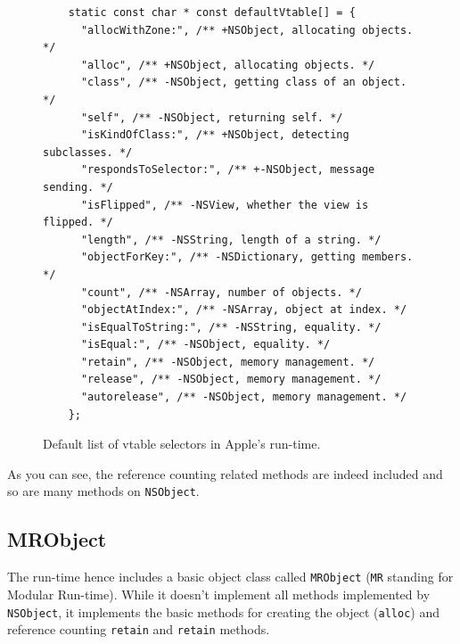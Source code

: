 \begin{figure}
  \begin{verbatim}
    static const char * const defaultVtable[] = {
      "allocWithZone:", /** +NSObject, allocating objects. */
      "alloc", /** +NSObject, allocating objects. */
      "class", /** -NSObject, getting class of an object. */
      "self", /** -NSObject, returning self. */
      "isKindOfClass:", /** +NSObject, detecting subclasses. */
      "respondsToSelector:", /** +-NSObject, message sending. */
      "isFlipped", /** -NSView, whether the view is flipped. */
      "length", /** -NSString, length of a string. */
      "objectForKey:", /** -NSDictionary, getting members. */
      "count", /** -NSArray, number of objects. */
      "objectAtIndex:", /** -NSArray, object at index. */
      "isEqualToString:", /** -NSString, equality. */
      "isEqual:", /** -NSObject, equality. */
      "retain", /** -NSObject, memory management. */
      "release", /** -NSObject, memory management. */ 
      "autorelease", /** -NSObject, memory management. */
    };
  \end{verbatim}
  \centering{}
  \caption{Default list of vtable selectors in Apple's run-time.}
  \label{fig:vtable_def_sels}
\end{figure}

As you can see, the reference counting related methods are indeed included and so are many methods on \verb=NSObject=.

\subsection{MRObject}

The run-time hence includes a basic object class called \verb=MRObject= (\verb=MR= standing for Modular Run-time). While it doesn't implement all methods implemented by \verb=NSObject=, it implements the basic methods for creating the object (\verb=alloc=) and reference counting \verb=retain= and \verb=retain= methods.

